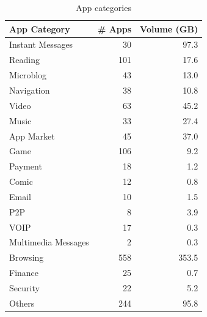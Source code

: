 \begin{table}[h]
	\centering
	\begin{tabular}{lrr}\hline
	App Category & \# Apps & Volume (GB) \\
    \hline
	Instant Messages & 30 & 97.3\\
	Reading & 101 & 17.6\\
	Microblog & 43 & 13.0\\
	Navigation  & 38 & 10.8\\
	Video  & 63 & 45.2\\
	Music  & 33 & 27.4\\
	App Market & 45 & 37.0\\
	Game  & 106 & 9.2\\
	Payment & 18 & 1.2\\
	Comic & 12 & 0.8\\
	Email & 10 & 1.5\\
	P2P & 8 & 3.9\\
	VOIP  & 17 & 0.3\\
	Multimedia Messages & 2 & 0.3\\
	Browsing & 558 & 353.5\\
	Finance  & 25 & 0.7\\
	Security  & 22 & 5.2\\
    Others  & 244 & 95.8\\
    \hline
	\end{tabular}
	\caption{App categories}
	\label{table:appcat}
\end{table}

